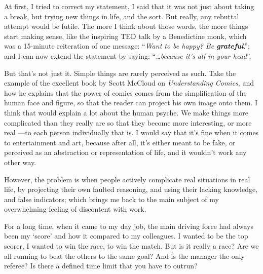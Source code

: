 \documentclass[b5paper]{book}
\begin{document}
At first, I tried to correct my statement, I said that it was not just about taking a break, but trying new things in life, and the sort. But really, any rebuttal attempt would be futile. The more I think about those words, the more things start making sense, like the inspiring TED talk by a Benedictine monk, which was a 15-minute reiteration of one message: ``\emph{Want to be happy? Be \textbf{grateful}}.''; and I can now extend the statement by saying: ``\emph{\ldots because it's all in your head}''.

But that's not just it. Simple things are rarely perceived as such. Take the example of the excellent book by Scott McCloud on \emph{Understanding Comics}, and how he explains that the power of comics comes from the simplification of the human face and figure, so that the reader can project his own image onto them. I think that would explain a lot about the human psyche. We make things more complicated than they really are so that they become more interesting, or more real ---to each person individually that is. I would say that it's fine when it comes to entertainment and art, because after all, it's either meant to be fake, or perceived as an abstraction or representation of life, and it wouldn't work any other way.

However, the problem is when people actively complicate real situations in real life, by projecting their own faulted reasoning, and using their lacking knowledge, and false indicators; which brings me back to the main subject of my overwhelming feeling of discontent with work.

For a long time, when it came to my day job, the main driving force had always been my `score' and how it compared to my colleagues. I wanted to be the top scorer, I wanted to win the race, to win the match. But is it really a race? Are we all running to beat the others to the same goal? And is the manager the only referee? Is there a defined time limit that you have to outrun?
\end{document}
